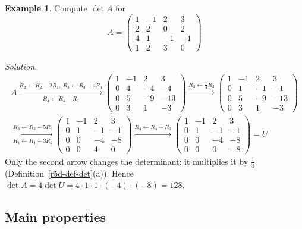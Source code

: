 \documentclass[12pt]{article}
\theoremstyle{definition}
\newtheorem{example}[theorem]{Example}
\begin{document}
\begin{example}\label{r5d-exm-rowred4}
Compute \(\det A\) for
\[
A=\begin{pmatrix}1&-1&2&3\\2&2&0&2\\4&1&-1&-1\\1&2&3&0\end{pmatrix}
\]

\textit{Solution.}
\[
\begin{gathered}
A\xrightarrow[R_4\leftarrow R_4-R_1]{R_2\leftarrow R_2-2R_1,\ R_3\leftarrow R_3-4R_1}
\begin{pmatrix}1&-1&2&3\\0&4&-4&-4\\0&5&-9&-13\\0&3&1&-3\end{pmatrix}
\xrightarrow{R_2\leftarrow\frac14R_2}
\begin{pmatrix}1&-1&2&3\\0&1&-1&-1\\0&5&-9&-13\\0&3&1&-3\end{pmatrix}
\\
\xrightarrow[R_4\leftarrow R_4-3R_2]{R_3\leftarrow R_3-5R_2}
\begin{pmatrix}1&-1&2&3\\0&1&-1&-1\\0&0&-4&-8\\0&0&4&0\end{pmatrix}
\xrightarrow{R_4\leftarrow R_4+R_3}
\begin{pmatrix}1&-1&2&3\\0&1&-1&-1\\0&0&-4&-8\\0&0&0&-8\end{pmatrix}=U
\end{gathered}
\]
Only the second arrow changes the determinant: it multiplies it by \(\frac14\)
(Definition~\ref{r5d-def-det}(a)). Hence
\(\det A=4\det U=4\cdot1\cdot1\cdot(-4)\cdot(-8)=128\).
\end{example}

\subsection*{Main properties}
\end{document}

